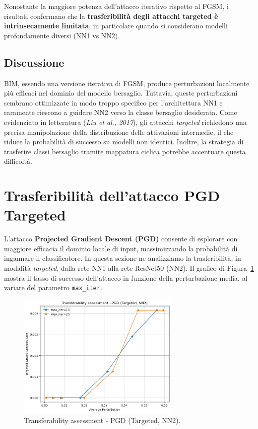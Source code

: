             \noindent Nonostante la maggiore potenza dell’attacco iterativo rispetto al FGSM, i risultati confermano che la \textbf{trasferibilità degli attacchi targeted è intrinsecamente limitata}, in particolare quando si considerano modelli profondamente diversi (NN1 vs NN2).

        \subsection{Discussione}
            BIM, essendo una versione iterativa di FGSM, produce perturbazioni localmente più efficaci nel dominio del modello bersaglio. Tuttavia, queste perturbazioni sembrano ottimizzate in modo troppo specifico per l’architettura NN1 e raramente riescono a guidare NN2 verso la classe bersaglio desiderata.
            Come evidenziato in letteratura (\textit{Liu et al., 2017}), gli attacchi \textit{targeted} richiedono una precisa manipolazione della distribuzione delle attivazioni intermedie, il che riduce la probabilità di successo su modelli non identici. Inoltre, la strategia di trasferire classi bersaglio tramite mappatura ciclica potrebbe accentuare questa difficoltà.

    \section{Trasferibilità dell'attacco PGD Targeted}
        L’attacco \textbf{Projected Gradient Descent (PGD)} consente di esplorare con maggiore efficacia il dominio locale di input, massimizzando la probabilità di ingannare il classificatore. In questa sezione ne analizziamo la trasferibilità, in modalità \textit{targeted}, dalla rete NN1 alla rete ResNet50 (NN2).
        Il grafico di Figura~\ref{fig:pgd_targeted_transfer} mostra il tasso di successo dell’attacco in funzione della perturbazione media, al variare del parametro \texttt{max\_iter}.
        
        \begin{figure}[H]
          \centering
          \includegraphics[width=0.7\textwidth]{images/pgd_targeted_transferability.png}
          \caption{Transferability assessment - PGD (Targeted, NN2).}
          \label{fig:pgd_targeted_transfer}
        \end{figure}

